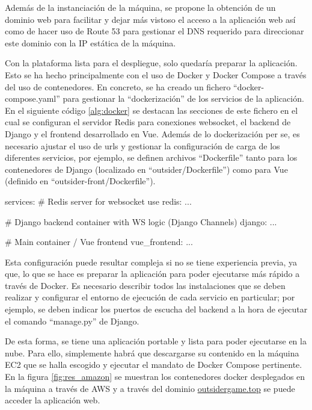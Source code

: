 Además de la instanciación de la máquina, se propone la obtención de un dominio web para facilitar y dejar más vistoso el acceso a la aplicación
web así como de hacer uso de Route 53 para gestionar el DNS requerido para direccionar este dominio con la IP estática de la máquina. 

Con la plataforma lista para el despliegue, solo quedaría preparar la aplicación. Esto se ha hecho principalmente con el uso de Docker y Docker Compose a través
del uso de contenedores. En concreto, se ha creado un fichero ``docker-compose.yaml'' para gestionar 
la ``dockerización'' de los servicios de la aplicación. En el siguiente código \ref{alg:docker} se destacan las secciones de este
fichero en el cual se configuran el servidor Redis para conexiones websocket, el backend de Django y el frontend
desarrollado en Vue. Además de lo dockerización per se, es necesario ajustar el uso de urls y gestionar la configuración
de carga de los diferentes servicios, por ejemplo, se definen archivos ``Dockerfile'' tanto para los contenedores
de Django (localizado en ``outsider/Dockerfile'') como para Vue (definido en ``outsider-front/Dockerfile'').

\begin{mypython}[float={h},caption={Estructura del fichero Docker Compose},label={alg:docker}]
	services:
		# Redis server for websocket use
		redis: ...
		
		# Django backend container with WS logic (Django Channels)
		django: ...
	  	
		# Main container / Vue frontend
		vue_frontend: ...
\end{mypython}

Esta configuración puede resultar compleja si no se tiene experiencia previa, ya que, lo que se hace es preparar
la aplicación para poder ejecutarse más rápido a través de Docker. Es necesario describir todos las 
instalaciones que se deben realizar y configurar el entorno de ejecución de cada servicio en particular; por ejemplo,
se deben indicar los puertos de escucha del backend a la hora de ejecutar el comando ``manage.py'' de Django.

De esta forma, se tiene una aplicación portable y lista para poder ejecutarse en la nube. Para ello, simplemente 
habrá que descargarse su contenido en la máquina EC2 que se halla escogido y ejecutar el mandato de Docker Compose pertinente. En la
figura \ref{fig:res_amazon} se muestran los contenedores docker desplegados en la máquina a través de AWS y a través del dominio 
\href{http://outsidergame.top/}{outsidergame.top} se puede acceder la aplicación web.

